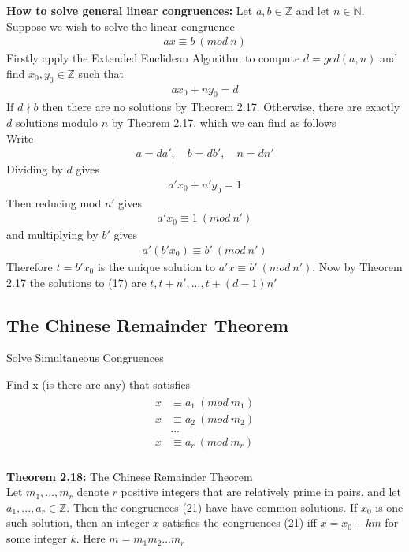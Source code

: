\documentclass[a4paper]{article}
\begin{document}
\textbf{How to solve general linear congruences:}
Let $a,b\in\mathbb{Z}$ and let $n\in\mathbb{N}$. Suppose we wish to solve the linear congruence
\begin{align}
    ax\equiv b\ (mod\ n)
\end{align}
Firstly apply the Extended Euclidean Algorithm to compute $d=gcd(a,n)$ and find $x_0,y_0\in\mathbb{Z}$ such that
\begin{align}
    ax_0+ny_0=d
\end{align}
If $d\nmid b$ then there are no solutions by Theorem 2.17. Otherwise, there are exactly $d$ solutions modulo $n$ by Theorem 2.17, which we can find as follows\\
Write
\begin{align}
    a=da',\quad b=db',\quad n=dn'
\end{align}
Dividing by $d$ gives
\begin{align}
    a'x_0+n'y_0=1
\end{align}
Then reducing mod $n'$ gives
\begin{align}
    a'x_0\equiv1\ (mod\ n')
\end{align}
and multiplying by $b'$ gives
\begin{align*}
    a'(b'x_0)\equiv b'\ (mod\ n')
\end{align*}
Therefore $t=b'x_0$ is the unique solution to $a'x\equiv b'\ (mod\ n')$. Now by Theorem 2.17 the solutions to (17) are $t,t+n',...,t+(d-1)n'$


\subsection{The Chinese Remainder Theorem}
Solve Simultaneous Congruences

Find x (is there are any) that satisfies
\begin{align}
    \begin{split}
        x & \equiv a_1\ (mod\ m_1)\\
        x & \equiv a_2\ (mod\ m_2)\\
          & ...\\
        x & \equiv a_r\ (mod\ m_r)\\
    \end{split}
\end{align}

\textbf{Theorem 2.18:} The Chinese Remainder Theorem\\
Let $m_1,...,m_r$ denote $r$ positive integers that are relatively prime in pairs, and let $a_1,...,a_r\in\mathbb{Z}$. Then the congruences (21) have have common solutions. If $x_0$ is one such solution, then an integer $x$ satisfies the congruences (21) iff $x=x_0+km$ for some integer $k$. Here $m=m_1m_2...m_r$
\end{document}
